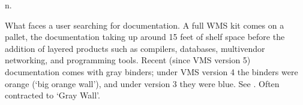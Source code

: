  n.

What faces a  user searching for documentation. A full
WMS kit comes on a pallet, the documentation taking up around 15 feet of
shelf space before the addition of layered products such as compilers,
databases, multivendor networking, and programming tools. Recent (since
VMS version 5) documentation comes with gray binders; under VMS version
4 the binders were orange (`big orange wall'), and under version 3 they
were blue. See . Often contracted to `Gray Wall'.

